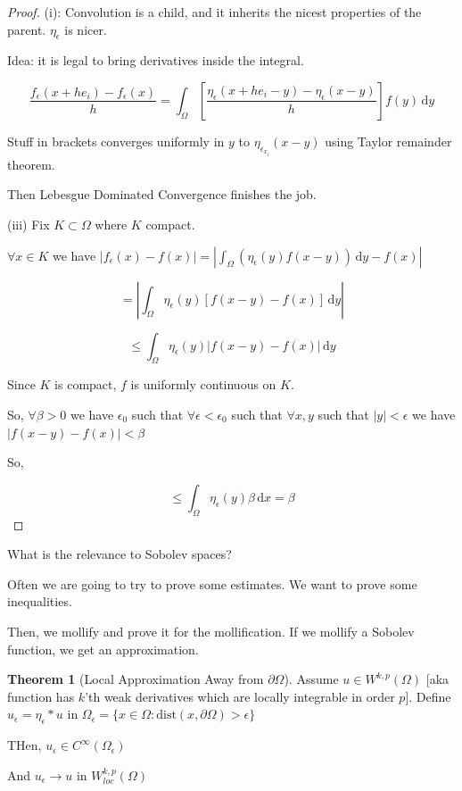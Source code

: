 \documentclass{article}
\theoremstyle{definition}
\newtheorem{theorem}{Theorem}
\begin{document}
\begin{proof}
    (i): Convolution is a child, and it inherits the nicest properties of the parent. \(\eta_{\epsilon}\) is nicer.

    Idea: it is legal to bring derivatives inside the integral. 

    \[
        \frac{f_{\epsilon}(x + he_i) - f_{\epsilon}(x)}{h} = \int_{\Omega }^{} \left[ \frac{\eta_{\epsilon} (x+he_i - y) - \eta_{\epsilon} (x-y)}{h} \right] f(y) \,\mathrm{d}y 
    \]

    Stuff in brackets converges uniformly in \(y\) to \(\eta_{\epsilon _{x_i}} (x-y)\) using Taylor remainder theorem.

    Then Lebesgue Dominated Convergence finishes the job.

    (iii) Fix \(K \subset \Omega\) where \(K\) compact.

    \(\forall x\in K\) we have \(\vert f_{\epsilon } (x) - f(x) \vert = \left\vert \int_{\Omega} (\eta_{\epsilon} (y) f(x-y)) \,\mathrm{d}y - f(x) \right\vert  \) 

    \[
        = \left\vert \int_{\Omega} \eta_{\epsilon} (y) \left[ f(x-y) - f(x) \right]  \,\mathrm{d}y  \right\vert 
    \]

    \[
        \leq \int_{\Omega} \eta_{\epsilon } (y) \left\vert f(x-y) - f(x) \right\vert  \,\mathrm{d}y 
    \]

    Since \(K\) is compact, \(f\) is uniformly continuous on \(K\).

    So, \(\forall \beta > 0\) we have \(\epsilon_0\) such that \(\forall \epsilon < \epsilon _0\) such that \(\forall x,y\) such that \(\vert y \vert < \epsilon\) we have \(\vert f(x-y) - f(x) \vert < \beta\) 

    So,

    \[
        \leq \int_{\Omega} \eta_{\epsilon}(y) \beta  \,\mathrm{d}x = \beta 
    \]

\end{proof}

What is the relevance to Sobolev spaces?

Often we are going to try to prove some estimates. We want to prove some inequalities.

Then, we mollify and prove it for the mollification. If we mollify a Sobolev function, we get an approximation.

\begin{theorem}
    [Local Approximation Away from \(\partial \Omega\)]

    Assume \(u \in W^{k,p}(\Omega)\) [aka function has \(k\)'th weak derivatives which are locally integrable in order \(p\)]. Define \(u_{\epsilon} = \eta_{\epsilon } \ast u \) in \(\Omega_{\epsilon } = \{ x\in \Omega : \text{dist} (x,\partial \Omega ) > \epsilon \} \) 
    
    THen, \(u_{\epsilon} \in C^{\infty}(\Omega_{\epsilon} )\) 

    And \(u_{\epsilon } \to u\) in \(W_{loc}^{k,p}(\Omega)\) 
\end{theorem}
\end{document}
